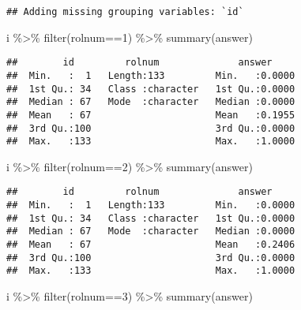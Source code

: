 \documentclass[
]{article}
\newenvironment{Shaded}{\begin{snugshade}}{\end{snugshade}}
\newcommand{\DecValTok}[1]{\textcolor[rgb]{0.00,0.00,0.81}{#1}}
\newcommand{\FunctionTok}[1]{\textcolor[rgb]{0.00,0.00,0.00}{#1}}
\newcommand{\NormalTok}[1]{#1}
\newcommand{\SpecialCharTok}[1]{\textcolor[rgb]{0.00,0.00,0.00}{#1}}
\begin{document}
\begin{enumerate}
\begin{verbatim}
## Adding missing grouping variables: `id`
\end{verbatim}

\begin{Shaded}
\begin{Highlighting}[]
\NormalTok{i }\SpecialCharTok{\%\textgreater{}\%} \FunctionTok{filter}\NormalTok{(rolnum}\SpecialCharTok{==}\DecValTok{1}\NormalTok{) }\SpecialCharTok{\%\textgreater{}\%} \FunctionTok{summary}\NormalTok{(answer)}
\end{Highlighting}
\end{Shaded}

\begin{verbatim}
##        id         rolnum              answer      
##  Min.   :  1   Length:133         Min.   :0.0000  
##  1st Qu.: 34   Class :character   1st Qu.:0.0000  
##  Median : 67   Mode  :character   Median :0.0000  
##  Mean   : 67                      Mean   :0.1955  
##  3rd Qu.:100                      3rd Qu.:0.0000  
##  Max.   :133                      Max.   :1.0000
\end{verbatim}

\begin{Shaded}
\begin{Highlighting}[]
\NormalTok{i }\SpecialCharTok{\%\textgreater{}\%} \FunctionTok{filter}\NormalTok{(rolnum}\SpecialCharTok{==}\DecValTok{2}\NormalTok{) }\SpecialCharTok{\%\textgreater{}\%} \FunctionTok{summary}\NormalTok{(answer)}
\end{Highlighting}
\end{Shaded}

\begin{verbatim}
##        id         rolnum              answer      
##  Min.   :  1   Length:133         Min.   :0.0000  
##  1st Qu.: 34   Class :character   1st Qu.:0.0000  
##  Median : 67   Mode  :character   Median :0.0000  
##  Mean   : 67                      Mean   :0.2406  
##  3rd Qu.:100                      3rd Qu.:0.0000  
##  Max.   :133                      Max.   :1.0000
\end{verbatim}

\begin{Shaded}
\begin{Highlighting}[]
\NormalTok{i }\SpecialCharTok{\%\textgreater{}\%} \FunctionTok{filter}\NormalTok{(rolnum}\SpecialCharTok{==}\DecValTok{3}\NormalTok{) }\SpecialCharTok{\%\textgreater{}\%} \FunctionTok{summary}\NormalTok{(answer)}
\end{Highlighting}
\end{Shaded}


\end{enumerate}
\end{document}
